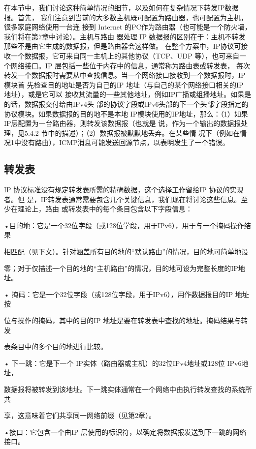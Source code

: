 在本节中，我们讨论这种简单情况的细节，以及如何在复杂情况下转发IP数据报。首先，
我们注意到当前的大多数主机既可配置为路由器，也可配置为主机，很多家庭网络使用一台连
接到 Internet 的PC作为路由器（也可能是一个防火墙，我们将在第7章中讨论）。主机与路由
器处理 IP 数据报的区别在于：主机不转发那些不是由它生成的数据报，但是路由器会这样做。
在整个方案中，IP协议可接收一个数据报，它可来自同一主机上的其他协议（TCP、UDP
等），也可来自一个网络接口。IP 层包括一些位于内存中的信息，通常称为路由表或转发表，
每次转发一个数据报时需要从中查找信息。当一个网络接口接收到一个数据报时，IP模块首
先检查目的地址是否为自己的IP 地址（与自己的某个网络接口相关的IP 地址），或是它可以
接收其流量的一些其他地址，例如IP广播或组播地址。如果是的话，数据报交付给由IPv4头
部的协议字段或IPv6头部的下一个头部字段指定的协议模块。如果数据报的目的地不是本地
IP模块使用的IP地址，那么：（1）如果IP层配置为一台路由器，则转发该数据报（也就是
说，作为一个输出的数据报处理，见5.4.2 节中的描述）；（2）数据报被默默地丢弃。在某些情
况下（例如在情况1中没有路由），ICMP消息可能发送回源节点，以表明发生了一个错误。

\subsection{转发表}
IP 协议标准没有规定转发表所需的精确数据，这个选择工作留给IP 协议的实现者。但
是，IP转发表通常需要包含几个关键信息，我们现在将讨论这些信息。至少在理论上，路由
或转发表中的每个条目包含以下字段信息：

•目的地：它是一个32位字段（或128位学段，用于IPv6），用于与一个掩码操作结果

相匹配（见下文）。针对涵盖所有目的地的“默认路由”的情况，目的地可简单地设

零；对于仅描述一个目的地的“主机路由”的情况，目的地可设为完整长度的IP地址。

• 掩码：它是一个32位字段（或128位字段，用于IPv6），用作数据报目的IP 地址按

位与操作的掩码，其中的目的IP 地址是要在转发表中查找的地址。掩码结果与转发

表条目中的多个目的地进行比较。

• 下一跳：它是下一个 IP实体（路由器或主机）的32位IPv4地址或128位 IPv6地址，

数据报将被转发到该地址。下一跳实体通常在一个网络中由执行转发查找的系统所共

享，这意味着它们共享同一网络前缀（见第2章）。

•接口：它包含一个由IP 层使用的标识符，以确定将数据报发送到下一跳的网络接口。

